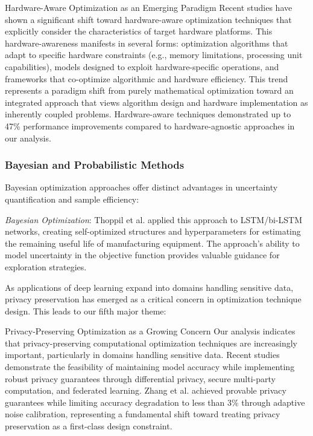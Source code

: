 \begin{themebox}{Hardware-Aware Optimization as an Emerging Paradigm}
Recent studies have shown a significant shift toward hardware-aware optimization techniques that explicitly consider the characteristics of target hardware platforms. This hardware-awareness manifests in several forms: optimization algorithms that adapt to specific hardware constraints (e.g., memory limitations, processing unit capabilities), models designed to exploit hardware-specific operations, and frameworks that co-optimize algorithmic and hardware efficiency. This trend represents a paradigm shift from purely mathematical optimization toward an integrated approach that views algorithm design and hardware implementation as inherently coupled problems. Hardware-aware techniques demonstrated up to 47\% performance improvements compared to hardware-agnostic approaches in our analysis.
\end{themebox}

\subsubsection{Bayesian and Probabilistic Methods}
Bayesian optimization approaches offer distinct advantages in uncertainty quantification and sample efficiency:

\textit{Bayesian Optimization}: Thoppil et al. \citep{Thoppil2021} applied this approach to LSTM/bi-LSTM networks, creating self-optimized structures and hyperparameters for estimating the remaining useful life of manufacturing equipment. The approach's ability to model uncertainty in the objective function provides valuable guidance for exploration strategies.

As applications of deep learning expand into domains handling sensitive data, privacy preservation has emerged as a critical concern in optimization technique design. This leads to our fifth major theme:

\begin{themebox}{Privacy-Preserving Optimization as a Growing Concern}
Our analysis indicates that privacy-preserving computational optimization techniques are increasingly important, particularly in domains handling sensitive data. Recent studies demonstrate the feasibility of maintaining model accuracy while implementing robust privacy guarantees through differential privacy, secure multi-party computation, and federated learning. Zhang et al. \citep{Zhang20229876} achieved provable privacy guarantees while limiting accuracy degradation to less than 3\% through adaptive noise calibration, representing a fundamental shift toward treating privacy preservation as a first-class design constraint.
\end{themebox}

